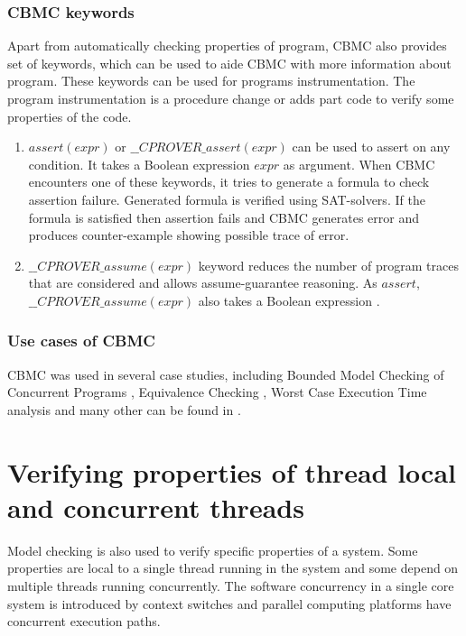 \subsubsection{CBMC keywords}
Apart from automatically checking properties of program, CBMC also provides set of keywords, which can be used to aide CBMC with more information about program. These keywords can be used for programs instrumentation. The program instrumentation is a procedure change or adds part code to verify some properties of the code.

\begin{enumerate}
\item $assert(expr)$ or $\_\_CPROVER\_assert(expr)$ can be used to assert on any condition. It takes a Boolean expression $expr$ as argument. When CBMC encounters one of these keywords, it tries to generate a formula to check assertion failure. Generated formula is verified using SAT-solvers. If the formula is satisfied then assertion fails and CBMC generates error and produces counter-example showing possible trace of error.
\item $\_\_CPROVER\_assume(expr)$  keyword reduces the number of program traces that are considered and allows assume-guarantee reasoning. As $assert$, $\_\_CPROVER\_assume(expr)$ also takes a Boolean expression \cite{clarke2006ansi}.
\end{enumerate}

\subsubsection{Use cases of CBMC}
CBMC was used in several case studies, including Bounded Model Checking of Concurrent Programs \cite{Rabinovitz05boundedmodel}, Equivalence Checking \cite{Staats:2008:PTV:1482985.1483006}, Worst Case Execution Time analysis \cite{springerlink:10.1007/978-3-540-88479-8_30, Kim_usinga} and many other can be found in \cite{website:cprover:cbmc:applications}.


\section{Verifying properties of thread local and concurrent threads}

Model checking is also used to verify specific properties of a system. Some properties are local to a single thread running in the system and some depend on multiple threads running concurrently. The software concurrency in a single core system is introduced by context switches and parallel computing platforms have concurrent execution paths.

